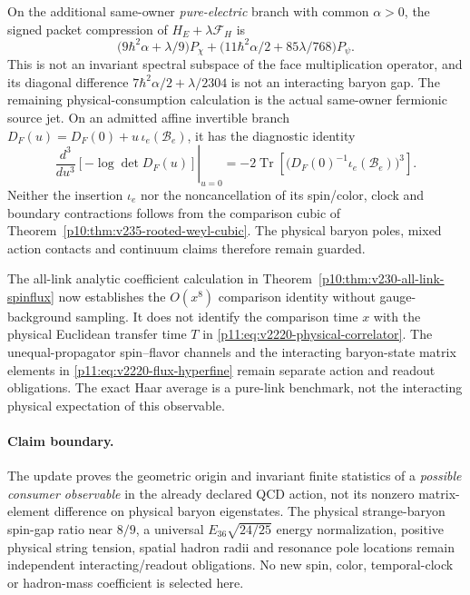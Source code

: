 \documentclass[12pt,a4paper]{article}
\begin{document}
\begin{remark}
\label{p11:rem:v235-source-vs-poles}
On the additional same-owner \emph{pure-electric} branch with common
\(\alpha>0\), the signed packet compression of
\(H_E+\lambda\mathcal F_H\) is
\[
 \bigl(9\hbar^2\alpha+\lambda/9\bigr)P_\chi+
 \bigl(11\hbar^2\alpha/2+85\lambda/768\bigr)P_\psi.
\]
This is not an invariant spectral subspace of the face multiplication
operator, and its diagonal difference
\(7\hbar^2\alpha/2+\lambda/2304\) is not an interacting baryon gap.
The remaining physical-consumption calculation is the actual
same-owner fermionic source jet.  On an admitted affine invertible
branch \(D_F(u)=D_F(0)+u\,\iota_e(\mathcal B_e)\), it has the
diagnostic identity
\[
 \left.\frac{d^3}{du^3}[-\log\det D_F(u)]\right|_{u=0}
 =-2\operatorname{Tr}\!\left[
   \bigl(D_F(0)^{-1}\iota_e(\mathcal B_e)\bigr)^3\right].
\]
Neither the insertion \(\iota_e\) nor the noncancellation of its
spin/color, clock and boundary contractions follows from the
comparison cubic of Theorem~\ref{p10:thm:v235-rooted-weyl-cubic}.
The physical baryon poles, mixed action contacts and continuum
claims therefore remain guarded.
\end{remark}

\begin{remark}
\label{p11:rem:v230-all-link-flux-readout}
The all-link analytic coefficient calculation in
Theorem~\ref{p10:thm:v230-all-link-spinflux} now establishes the
$O(x^8)$ comparison identity without gauge-background sampling.  It
does not identify the comparison time $x$ with the physical Euclidean
transfer time $T$ in \eqref{p11:eq:v2220-physical-correlator}.
The unequal-propagator spin--flavor channels and the interacting
baryon-state matrix elements in
\eqref{p11:eq:v2220-flux-hyperfine} remain separate action and readout
obligations.  The exact Haar average is a pure-link benchmark, not the
interacting physical expectation of this observable.
\end{remark}

\paragraph{Claim boundary.}
The update proves the geometric origin and invariant finite statistics
of a \emph{possible consumer observable} in the already declared QCD
action, not its nonzero matrix-element difference on physical baryon
eigenstates.  The physical strange-baryon spin-gap ratio near $8/9$,
a universal $E_{36}\sqrt{24/25}$ energy normalization, positive physical
string tension, spatial hadron radii and resonance pole locations
remain independent interacting/readout obligations.  No new spin,
color, temporal-clock or hadron-mass coefficient is selected here.
\end{document}
